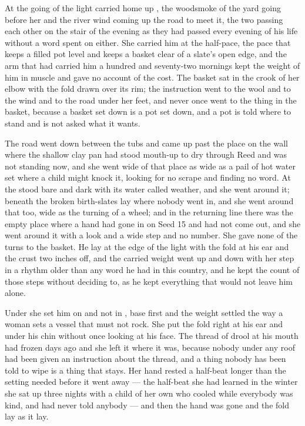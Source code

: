 At the going of the light  carried  home up , the woodsmoke of the yard going before her and the river wind coming up the road to meet it, the two passing each other on the stair of the evening as they had passed every evening of his life without a word spent on either. She carried him at the half-pace, the pace that keeps a filled pot level and keeps a basket clear of a slate's open edge, and the arm that had carried him a hundred and seventy-two mornings kept the weight of him in muscle and gave no account of the cost. The basket sat in the crook of her elbow with the fold drawn over its rim; the instruction went to the wool and to the wind and to the road under her feet, and never once went to the thing in the basket, because a basket set down is a pot set down, and a pot is told where to stand and is not asked what it wants.

The road went down between the tubs and came up past the place on the wall where the shallow clay pan had stood mouth-up to dry through Reed and was not standing now, and she went wide of that place as wide as a pail of hot water set where a child might knock it, looking for no scrape and finding no word. At  the  stood bare and dark with its water called weather, and she went around it; beneath  the broken birth-slates lay where nobody went in, and she went around that too, wide as the turning of a wheel; and in the returning line there was the empty place where a hand had gone in on Seed 15 and had not come out, and she went around it with a look and a wide step and no number. She gave none of the turns to the basket. He lay at the edge of the light with the fold at his ear and the crust two inches off, and the carried weight went up and down with her step in a rhythm older than any word he had in this country, and he kept the count of those steps without deciding to, as he kept everything that would not leave him alone.

Under  she set him on  and not in , base first and the weight settled the way a woman sets a vessel that must not rock. She put the fold right at his ear and under his chin without once looking at his face. The thread of drool at his mouth had frozen days ago and she left it where it was, because nobody under any roof had been given an instruction about the thread, and a thing nobody has been told to wipe is a thing that stays. Her hand rested a half-beat longer than the setting needed before it went away --- the half-beat she had learned in the winter she sat up three nights with a child of her own who cooled while everybody was kind, and had never told anybody --- and then the hand was gone and the fold lay as it lay.

